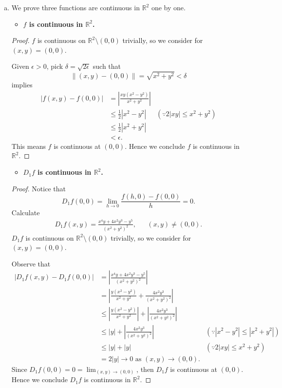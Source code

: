 \begin{Exercise}
	\begin{enumerate}[(a)]
		\item
		We prove three functions are continuous in $\mathbb{R}^2$ one by one.
		\begin{itemize}
			\item \textbf{$f$ is continuous in $\mathbb{R}^2$.}
		\end{itemize}
		\begin{proof}
			$f$ is continuous on $\mathbb{R}^2\setminus (0,0)$ trivially, so we consider for $(x,y) = (0,0)$. 
			
			Given $\epsilon>0$, pick $\delta = \sqrt{2\epsilon}$ such that
			$$
			\| (x,y) - (0,0) \| = \sqrt{x^2+y^2} < \delta
			$$
			implies
			\begin{align*}
			|f(x,y)-f(0,0)|
			&= \left| \frac{xy(x^2-y^2)}{x^2+y^2} \right| \\
			&\leq \frac{1}{2}|x^2-y^2| & (\because 2|xy| \leq x^2+y^2) \\
			&\leq \frac{1}{2} |x^2+y^2| \\
			&< \epsilon.
			\end{align*}
			This means $f$ is continuous at $(0,0)$.
			Hence we conclude $f$ is continuous in $\mathbb{R}^2$.
		\end{proof}
		
		\begin{itemize}
			\item \textbf{$D_1 f$ is continuous in $\mathbb{R}^2$.}
		\end{itemize}
		\begin{proof}
			Notice that 
			$$
			D_1 f(0,0)
			= \lim_{h\to 0} \frac{f(h,0)-f(0,0)}{h}
			= 0.
			$$
			Calculate
			\begin{align*}
			D_1 f(x,y) = \frac{x^4 y + 4x^2 y^3 - y^5}{(x^2+y^2)^2}, && (x,y)\neq(0,0).
			\end{align*}
			$D_1 f$ is continuous on $\mathbb{R}^2\setminus (0,0)$ trivially, so we consider for $(x,y) = (0,0)$.
			
			Observe that
			\begin{align*}
			|D_1 f(x,y)-D_1 f(0,0)|
			&= \left| \frac{x^4 y + 4x^2 y^3 - y^5}{(x^2+y^2)^2} \right| \\
			&= \left| \frac{y(x^2-y^2)}{x^2+y^2} + \frac{4x^2y^3}{(x^2+y^2)^2} \right| \\
			&\leq \left| \frac{y(x^2-y^2)}{x^2+y^2} \right| + \left| \frac{4x^2y^3}{(x^2+y^2)^2} \right| \\
			&\leq |y| + \left| \frac{4x^2y^3}{(x^2+y^2)^2} \right| & (\because |x^2-y^2| \leq |x^2+y^2|) \\
			&\leq |y| + |y| & (\because 2|xy|\leq x^2+y^2) \\
			&= 2|y| \to 0 \text{ as } (x,y) \to (0,0).
			\end{align*}
			Since $D_1 f(0,0) = 0 = \lim_{(x,y)\to(0,0)}$, then $D_1 f$ is continuous at $(0,0)$.
			Hence we conclude $D_1 f$ is continuous in $\mathbb{R}^2$.
		\end{proof}
		

\end{enumerate}
\end{Exercise}
